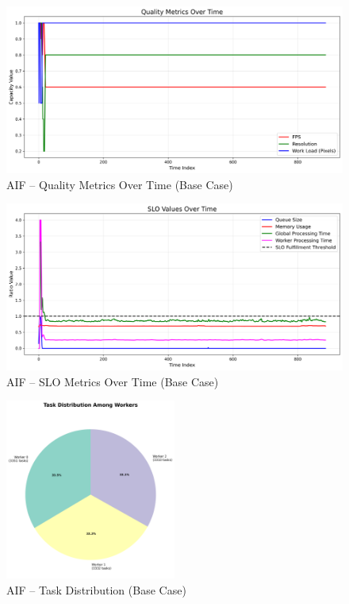 \begin{figure}[h]
    \centering
    \includegraphics[width=\textwidth]{img/results/basic_sim/active_inference_relative_control_quality_metrics.png}
    \caption{AIF – Quality Metrics Over Time (Base Case)}
\end{figure}
\begin{figure}[h]
    \centering
    \includegraphics[width=\textwidth]{img/results/basic_sim/active_inference_relative_control_slo_values.png}
    \caption{AIF – SLO Metrics Over Time (Base Case)}
\end{figure}
\begin{figure}[h]
    \centering
    \includegraphics[width=0.5\textwidth]{img/results/basic_sim/active_inference_relative_control_task_distribution_pie.png}
    \caption{AIF – Task Distribution (Base Case)}
\end{figure}
